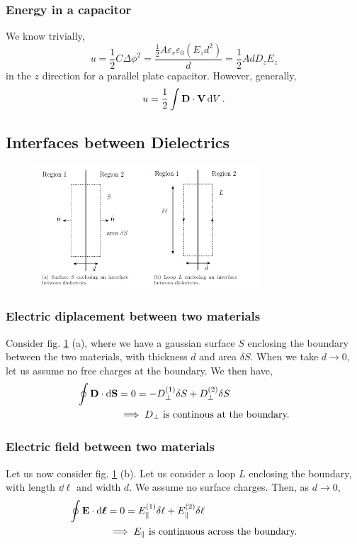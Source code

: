 \documentclass{book}
\begin{document}
\subsubsection{Energy in a capacitor}
We know trivially,
\begin{equation}
	u = \frac{1}{2}C \Delta \phi^2 =  \frac{\frac{1}{2}A\varepsilon_r\varepsilon_0\left(E_zd^2\right)}{d} = \frac{1}{2}AdD_zE_z
\end{equation}
in the $z$ direction for a parallel plate capacitor. However, generally,
\begin{equation}
	u = \frac{1}{2}\int \vb{D}\cdot\vb{V}\dd{V}.
\end{equation}
\subsection{Interfaces between Dielectrics}
\begin{figure}
	\centering
	\includegraphics[width=0.75\textwidth]{interface.png}
	\caption{}
	\label{fig:interface}
\end{figure}
\subsubsection{Electric diplacement between two materials}
Consider fig. \ref{fig:interface} (a), where we have a gaussian surface $S$ enclosing the boundary between the two materials, with thickness $d$ and area $\delta S$. When we take $d \to 0$, let us assume no free charges at the boundary. We then have,
\begin{equation}
	\begin{split}
	\oint\vb{D}\cdot\dd{\vb{S}} & = 0 = -D_{\perp}^{(1)}\delta S + D_{\perp}^{(2)}\delta S \\
	& \implies D_{\perp}\text{ is continous at the boundary.}
	\end{split}
\end{equation}
\subsubsection{Electric field between two materials}
Let us now consider fig. \ref{fig:interface} (b). Let us consider a loop $L$ enclosing the boundary, with length $\dd{\ell}$ and width $d$. We assume no surface charges. Then, as $d \to 0$,
\begin{equation}
	\begin{split}
	\oint \vb{E} \cdot\dd{\vb*{\ell}} & = 0 = E_{\parallel}^{(1)}\delta \ell + E_{\parallel}^{(2)}\delta\ell \\
	& \implies E_{\parallel}\text{ is continuous across the boundary.}
	\end{split}
\end{equation}
\end{document}
